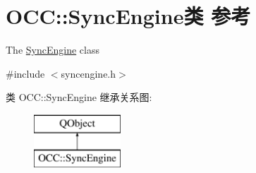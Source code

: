 \hypertarget{class_o_c_c_1_1_sync_engine}{}\section{O\+CC\+:\+:Sync\+Engine类 参考}
\label{class_o_c_c_1_1_sync_engine}


The \hyperlink{class_o_c_c_1_1_sync_engine}{Sync\+Engine} class  




{\ttfamily \#include $<$syncengine.\+h$>$}

类 O\+CC\+:\+:Sync\+Engine 继承关系图\+:\begin{figure}[H]
\begin{center}
\leavevmode
\includegraphics[height=2.000000cm]{class_o_c_c_1_1_sync_engine}
\end{center}
\end{figure}
